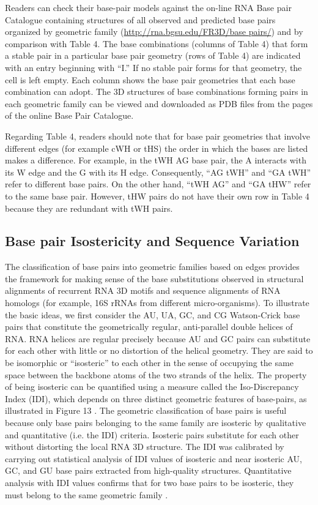 Readers can check their base-pair models against the on-line RNA Base pair
Catalogue containing structures of all observed and predicted base pairs
organized by geometric family (\url{http://rna.bgsu.edu/FR3D/base pairs/}) and
by comparison with Table 4. The base combinations (columns of Table 4) that form
a stable pair in a particular base pair geometry (rows of Table 4) are indicated
with an entry beginning with ``I.'' If no stable pair forms for that geometry, the
cell is left empty. Each column shows the base pair geometries that each base
combination can adopt. The 3D structures of base combinations forming pairs in
each geometric family can be viewed and downloaded as PDB files from the pages
of the online Base Pair Catalogue. 

Regarding Table 4, readers should note that for base pair geometries that
involve different edges (for example cWH or tHS) the order in which the bases
are listed makes a difference. For example, in the tWH AG base pair, the A
interacts with its W edge and the G with its H edge. Consequently, ``AG tWH''
and ``GA tWH'' refer to different base pairs. On the other hand, ``tWH AG'' and
``GA tHW'' refer to the same base pair. However, tHW pairs do not have their own
row in Table 4 because they are redundant with tWH pairs. 

\subsection{Base pair Isostericity and Sequence Variation}

The classification of base pairs into geometric families based on edges provides
the framework for making sense of the base substitutions observed in structural
alignments of recurrent RNA 3D motifs and sequence alignments of RNA homologs
(for example, 16S rRNAs from different micro-organisms). To illustrate the basic
ideas, we first consider the AU, UA, GC, and CG Watson-Crick base pairs that
constitute the geometrically regular, anti-parallel double helices of RNA. RNA
helices are regular precisely because AU and GC pairs can substitute for each
other with little or no distortion of the helical geometry. They are said to be
isomorphic or “isosteric” to each other in the sense of occupying the same space
between the backbone atoms of the two strands of the helix. The property of
being isosteric can be quantified using a measure called the Iso-Discrepancy
Index (IDI), which depends on three distinct geometric features of base-pairs,
as illustrated in Figure 13 \cite{Stombaugh2009}. The geometric classification
of base pairs is useful because only base pairs belonging to the same family are
isosteric by qualitative and quantitative (i.e. the IDI) criteria. Isosteric
pairs substitute for each other without distorting the local RNA 3D structure.
The IDI was calibrated by carrying out statistical analysis of IDI values of
isosteric and near isosteric AU, GC, and GU base pairs extracted from
high-quality structures. Quantitative analysis with IDI values confirms that for
two base pairs to be isosteric, they must belong to the same geometric family
\cite{Stombaugh2009}. 

